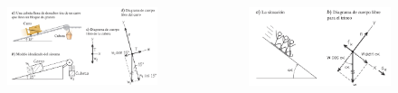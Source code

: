 \begin{frame}
\begin{columns}
    \begin{figure}
        \centering
        \includegraphics[width=1\linewidth]{figures/diagrama3.jpg}
    \end{figure}

    \begin{figure}
        \centering
        \includegraphics[width=1\linewidth]{figures/diagrama4.jpg}
    \end{figure}
\end{columns}
    
\end{frame}


